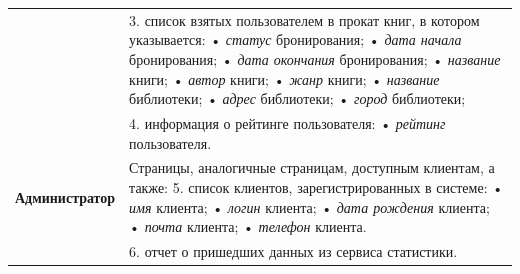\documentclass[a4paper, 12pt]{article}
\begin{document}
\begin{large}
\begin{longtable}{|p{0.5cm}|p{15.5cm}|}
	&
	3. список взятых пользователем в прокат книг, в котором указывается: \newline
	• \textit{статус} бронирования; \newline
	• \textit{дата начала} бронирования; \newline
	• \textit{дата окончания} бронирования; \newline
	• \textit{название} книги; \newline
	• \textit{автор} книги; \newline
	• \textit{жанр} книги; \newline
	• \textit{название} библиотеки; \newline
	• \textit{адрес} библиотеки; \newline
	• \textit{город} библиотеки; \\
	\cline{2-2}
	
	&
	4. информация о рейтинге пользователя: \newline
	• \textit{рейтинг} пользователя. \\
	\hline
	
	\begin{rotatebox}[origin=r]{90}
		{ \textbf{Администратор}}
	\end{rotatebox} 
	& 
    Страницы, аналогичные страницам, доступным клиентам, а также:
	5. список клиентов, зарегистрированных в системе: \newline
	• \textit{имя} клиента; \newline
	• \textit{логин} клиента; \newline
    • \textit{дата рождения} клиента; \newline
	• \textit{почта} клиента; \newline
	• \textit{телефон} клиента. \\
    \cline{2-2}
	
	&
	6. отчет о пришедших данных из сервиса статистики. \\
	\hline
\end{longtable}


\end{large}
\end{document}
